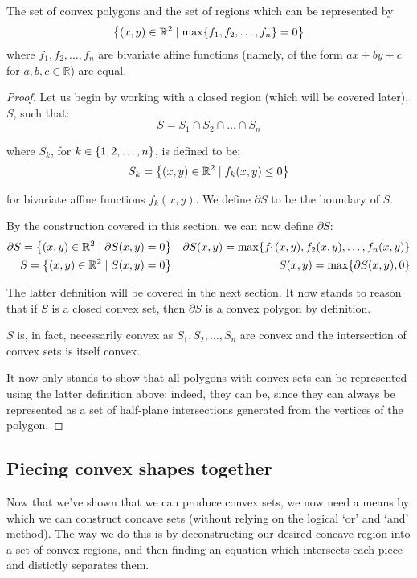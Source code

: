 \begin{theorem}
    \label{theorem:convex_polygons}
    The set of convex polygons and the set of regions which can be represented by
    $$
        \br*{(x,y)\in\mathbb{R}^2\mid \max\br*{f_1,f_2,\dots,f_n}=0}
    $$
    where $f_1,f_2,\dots,f_n$ are bivariate affine functions (namely, of the form $ax+by+c$ for $a,b,c\in\mathbb{R}$) are equal.

    \begin{proof}
        Let us begin by working with a closed region (which will be covered later), $S$, such that:
        $$
            S=S_1\cap S_2\cap \dots\cap S_n
        $$

        where $S_k$, for $k\in\br{1,2,\dots,n}$, is defined to be:
        $$
            S_k=\br*{(x,y)\in\mathbb{R}^2\mid f_k(x,y)\leq 0}
        $$

        for bivariate affine functions $f_k(x,y)$. We define $\partial S$ to be the boundary of $S$.

        By the construction covered in this section, we can now define $\partial S$:
        \begin{align*}
            \partial S = \br*{(x,y)\in\mathbb{R}^2\mid \partial S(x,y)=0} & & \partial S(x,y)=\max\br*{f_1(x,y),f_2(x,y),\dots,f_n(x,y)} \\
            S = \br*{(x,y)\in\mathbb{R}^2\mid S(x,y)=0} & & S(x,y)=\max\br{\partial S(x,y),0}
        \end{align*}

        The latter definition will be covered in the next section. It now stands to reason that if $S$ is a closed convex set, then $\partial S$ is a convex polygon by definition.

        $S$ is, in fact, necessarily convex as $S_1,S_2,\dots,S_n$ are convex and the intersection of convex sets is itself convex.

        It now only stands to show that all polygons with convex sets can be represented using the latter definition above: indeed, they can be, since they can always be represented as a set of half-plane intersections generated from the vertices of the polygon.
    \end{proof}
\end{theorem}

\subsection{Piecing convex shapes together}
Now that we've shown that we can produce convex sets, we now need a means by which we can construct concave sets (without relying on the logical `or' and `and' method). The way we do this is by deconstructing our desired concave region into a set of convex regions, and then finding an equation which intersects each piece and distictly separates them.

